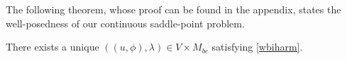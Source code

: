 \documentclass[a4paper,final]{siamltex}
\newtheorem{remark}[theorem]{Remark}
\newcommand{\M}{{M_{bc}}}
\begin{document}
\medskip

The following theorem, whose proof can be found in the appendix, states the well-posedness of our continuous
saddle-point problem.

\begin{theorem}
\label{TMexistence}
There exists a unique $((u,\phi),\lambda) \in V \times \M$ satisfying \eqref{wbiharm}.
\end{theorem}

\begin{comment}%
\begin{remark}\label{lm}
\del{If $u$ is sufficiently regular, 
the Lagrange multiplier $\lambda$ in \eqref{wbiharm} satisfies 
$\lambda = \Delta \phi= \Delta^2 u$. Moreover, 
setting $\psi=0$ in the first equation of \eqref{wbiharm}, we get 
$ \int_{\Omega} \nabla \lambda \cdot \nabla v\,dx = \ell(v), 
\quad v \in H^1_0(\Omega).$
Thus for simply supported boundary conditions, 
a unique Lagrange multiplier solution $\lambda \in H^1_0(\Omega)$ 
also follows from this equation.}
\end{remark}


\textcolor{purple}{[JD: this is a long remark, would it make sense to put it in an appendix? We also need to
make explicit, at the start of the reasoning, that this equivalence is not needed for our numerical analysis,
because we only work with the saddle-point problem. It's just provided to show that this saddle-point problem
is equivalent to our original PDE. This important because, in practice, we obviously don't have the high regularity
properties on $\Omega$ that this proof requires, so this equivalence remains purely anecdotical for us -- that might
not please the referee of course...]}


\end{comment}
\end{document}
